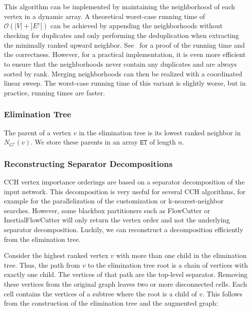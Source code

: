 \documentclass[a4paper, english, cleveref]{lipics-v2021}
\newcommand*{\gchu}{G^{\uparrow}}
\newcommand*{\echu}{E^{\uparrow}}
\begin{document}
This algorithm can be implemented by maintaining the neighborhood of each vertex in a dynamic array.
A theoretical worst-case running time of $\mathcal{O}(|V| + |\echu|)$ can be achieved by appending the neighborhoods without checking for duplicates and only performing the deduplication when extracting the minimally ranked upward neighbor.
See~\cite{TODO} for a proof of the running time and the correctness.
However, for a practical implementation, it is even more efficient to ensure that the neighborhoods never contain any duplicates and are always sorted by rank.
Merging neighborhoods can then be realized with a coordinated linear sweep.
The worst-case running time of this variant is slightly worse, but in practice, running times are faster.

\subsubsection{Elimination Tree}

The parent of a vertex $v$ in the elimination tree is its lowest ranked neighbor in $N_{\gchu}(v)$.
We store these parents in an array $\mathtt{ET}$ of length $n$.

\subsubsection{Reconstructing Separator Decompositions}
\label{sec:reconstruct_sep_tree}

CCH vertex importance orderings are based on a separator decomposition of the input network.
This decomposition is very useful for several CCH algorithms, for example for the parallelization of the customization or k-nearest-neighbor searches.
However, some blackbox partitioners such as FlowCutter or InertialFlowCutter will only return the vertex order and not the underlying separator decomposition.
Luckily, we can reconstruct a decomposition efficiently from the elimination tree.

Consider the highest ranked vertex $v$ with more than one child in the elimination tree.
Thus, the path from $v$ to the elimination tree root is a chain of vertices with exactly one child.
The vertices of that path are the top-level separator.
Removing these vertices from the original graph leaves two or more disconnected cells.
Each cell contains the vertices of a subtree where the root is a child of $v$.
This follows from the construction of the elimination tree and the augmented graph:
\end{document}
